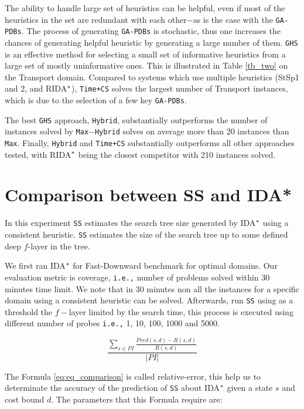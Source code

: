 The ability to handle large set of heuristics can be helpful, even if most of the heuristics in the set are redundant with each other$-$as is the case with the \texttt{GA-PDBs}. The process of generating \texttt{GA-PDBs} is stochastic, thus one increases the chances of generating helpful heuristic by generating a large number of them. \texttt{GHS} is an effective method for selecting a small set of informative heuristics from a large set of mostly uninformative ones. This is illustrated in Table \ref{tb_two} on the Transport domain. Compared to systems which use multiple heuristics (StSp1 and 2, and RIDA$\sp{*}$), \texttt{Time+CS} solves the largest number of Transport instances, which is due to the selection of a few key \texttt{GA-PDBs}.

The best \texttt{GHS} approach, \texttt{Hybrid}, substantially outperforms the number of instances solved by \texttt{Max$-$Hybrid} solves on average more than 20 instances than \texttt{Max}. Finally, \texttt{Hybrid} and \texttt{Time+CS} substantially outperforms all other approaches tested, with RIDA$\sp{*}$ being the closest competitor with 210 instances solved.

\section{Comparison between SS and IDA*}
\noindent
In this experiment \texttt{SS} estimates the search tree size generated by IDA$\sp{*}$ using a consistent heuristic. \texttt{SS} estimates the size of the search tree up to some defined deep $f$-layer in the tree.

We first ran IDA$\sp{*}$ for Fast-Downward benchmark for optimal domains. Our evaluation metric is coverage, \texttt{i.e.,} number of problems solved within 30 minutes time limit. We note that in 30 minutes non all the instances for a specific domain using a consistent heuristic can be solved. Afterwards, run \texttt{SS} using as a threshold the $f-$layer limited by the search time, this process is executed using different number of probes \texttt{i.e.,} 1, 10, 100, 1000 and 5000.

\begin{equation}
\frac{\sum_{s\in PI} \frac{Pred(s, d) - R(s, d)}{R(s, d)}}{|PI|}
\label{eq:eq_comparison}
\end{equation}

The Formula \ref{eq:eq_comparison} is called relative-error, this help us to determinate the accuracy of the prediction of \texttt{SS} about IDA$\sp{*}$ given a state $s$ and cost bound $d$. The parameters that this Formula require are:

